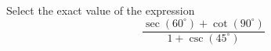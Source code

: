 \documentclass{ximera}
\author{Ivo Terek}
\begin{document}
\begin{exercise}

Select the exact value of the expression $$\frac{\sec(60^\circ) + \cot(90^\circ)}{1+\csc(45^\circ)}$$
\begin{multipleChoice}
\end{multipleChoice}



\end{exercise}
\end{document}
